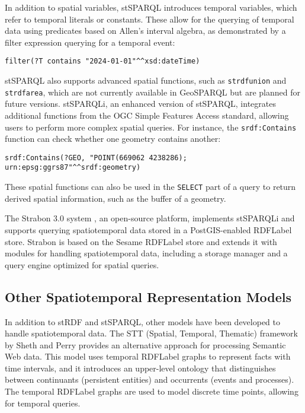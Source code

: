In addition to spatial variables, stSPARQL introduces temporal variables, which refer to temporal literals or constants. These allow for the querying of temporal data using predicates based on Allen's interval algebra, as demonstrated by a filter expression querying for a temporal event:
\begin{lstlisting}[caption=Filter command with contains predicate, label={lstfilter-inside}]
filter(?T contains "2024-01-01"^^xsd:dateTime)
\end{lstlisting}

stSPARQL also supports advanced spatial functions, such as \texttt{\gls{strdf}union} and \texttt{\gls{strdf}area}, which are not currently available in GeoSPARQL but are planned for future versions. stSPARQLi, an enhanced version of stSPARQL, integrates additional functions from the OGC Simple Features Access standard, allowing users to perform more complex spatial queries. For instance, the \texttt{srdf:Contains} function can check whether one geometry contains another:
\begin{lstlisting}[caption=strdf function Contains in stSPARQL, label={lstfilter-inside}]
srdf:Contains(?GEO, "POINT(669062 4238286); urn:epsg:ggrs87"^^srdf:geometry)
\end{lstlisting}
These spatial functions can also be used in the \texttt{SELECT} part of a query to return derived spatial information, such as the buffer of a geometry.

The Strabon 3.0 system \cite{krr&ateamStrabon}, an open-source platform, implements stSPARQLi and supports querying spatiotemporal data stored in a PostGIS-enabled\cite{PostGIS} \acrshort{RDFLabel} store. Strabon is based on the Sesame \acrshort{RDFLabel} store and extends it with modules for handling spatiotemporal data, including a storage manager and a query engine optimized for spatial queries.

\subsection{Other Spatiotemporal Representation Models}\label{III-subsec:otherSpatiotemporal}

In addition to stRDF and stSPARQL, other models have been developed to handle spatiotemporal data. The STT (Spatial, Temporal, Thematic) framework by Sheth and Perry \cite{perryFrameworkSupportSpatial2008} provides an alternative approach for processing Semantic Web data. This model uses temporal \acrshort{RDFLabel} graphs to represent facts with time intervals, and it introduces an upper-level ontology that distinguishes between continuants (persistent entities) and occurrents (events and processes). The temporal \acrshort{RDFLabel} graphs are used to model discrete time points, allowing for temporal queries.

